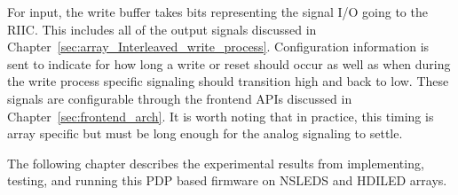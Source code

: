     For input, the write buffer takes bits representing the signal I/O going to the RIIC. This includes all of the output signals discussed in Chapter~\ref{sec:array_Interleaved_write_process}. Configuration information is sent to indicate for how long a write or reset should occur as well as when during the write process specific signaling should transition high and back to low. These signals are configurable through the frontend APIs discussed in Chapter~\ref{sec:frontend_arch}. It is worth noting that in practice, this timing is array specific but must be long enough for the analog signaling to settle.

    The following chapter describes the experimental results from implementing, testing, and running this PDP based firmware on NSLEDS and HDILED arrays.
